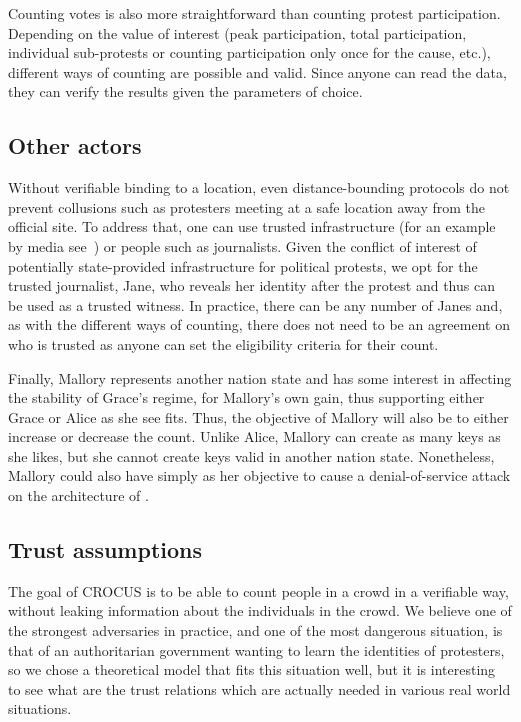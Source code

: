 Counting votes is also more straightforward than counting protest participation. 
Depending on the value of interest (\eg peak participation, total participation, individual sub-protests or counting participation only once for the cause, etc.), different ways of counting are
possible and valid. 
Since anyone can read the data, they can verify the results given the parameters of choice.

\subsection{Other actors}

Without verifiable binding to a location, even distance-bounding protocols do not prevent collusions such as protesters meeting at a safe location away from the official site. 
To address that, one can use trusted infrastructure (for an example by media see~\cite{LeMondeProtestingSolution}) or people such as journalists. 
Given the conflict of interest of potentially state-provided infrastructure for political protests, we opt for the trusted journalist, Jane, who reveals her identity after the protest and thus can be used as a trusted witness. 
In practice, there can be any number of  Janes and, as with the different ways of counting, there does not need to be an agreement on who is trusted as anyone can set the eligibility criteria for their count.

Finally, Mallory represents another nation state and has some interest in affecting the stability of Grace's regime, for Mallory's own gain, thus supporting either Grace or Alice as she see fits.  
Thus, the objective of Mallory will also be to either increase or decrease the count. 
Unlike Alice, Mallory can create as many keys as she likes, but she cannot create keys valid in another nation state. 
Nonetheless, Mallory could also have simply as her objective to cause a denial-of-service attack on the architecture of \CROCUS.


\subsection{Trust assumptions}

The goal of CROCUS is to be able to count people in a crowd in a verifiable way, without leaking information about the individuals in the crowd.
We believe one of the strongest adversaries in practice, and one of the most dangerous situation, is that of an authoritarian government wanting to learn the identities of protesters,
so we chose a theoretical model that fits this situation well, but it is interesting to see what are the trust relations which are actually needed in various real world situations.

